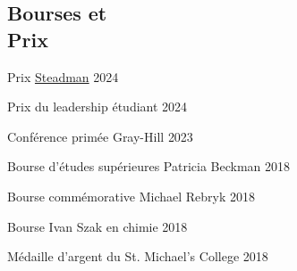 \documentclass[margin,line]{res}
\newenvironment{list2}{
 \begin{list}{$\bullet$}{%
  \setlength{\itemsep}{0in}
  \setlength{\parsep}{0in} \setlength{\parskip}{0in}
  \setlength{\topsep}{0in} \setlength{\partopsep}{0in} 
  \setlength{\leftmargin}{0.2in}}}{\end{list}}
\begin{document}
\begin{resume}
%






\section{\sc Bourses et \\Prix}
\vspace{2mm}
Prix \href{https://www.rochester.edu/college/gradstudies/postdocs/steadman-awards.html}{Steadman} \hfill{2024}

\vspace*{-3mm}

Prix du leadership étudiant \hfill {2024}

\vspace*{-3mm}

Conférence primée Gray-Hill \hfill{2023}

\vspace*{-3mm}

Bourse d'études supérieures Patricia Beckman \hfill {2018}

\vspace*{-3mm}

Bourse commémorative Michael Rebryk \href{http://ucu-building-community.blogspot.ca/2016/03/ucu-adds-new-scholarships-in-2016.html}{}\hfill {2018}

\vspace*{-3mm}

Bourse Ivan Szak en chimie \hfill {2018}

\vspace*{-3mm}

Médaille d'argent du St. Michael's College \hfill {2018} 


\end{resume}
\end{document}
